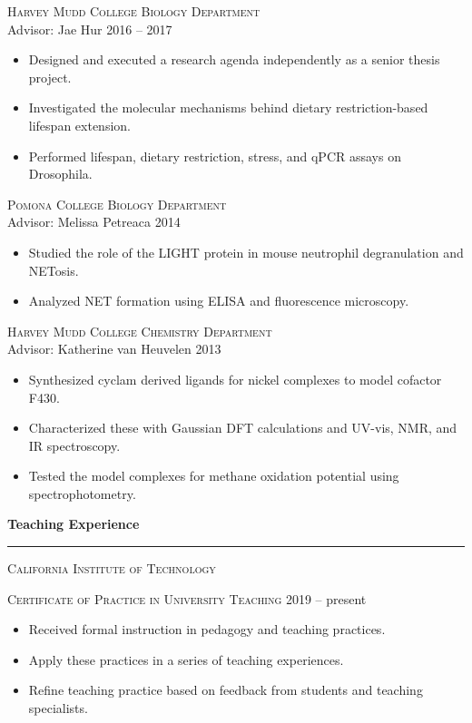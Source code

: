 \documentclass{article}
\newcommand{\cvsection}[1]{%
	{\large \textbf{#1\phantom{,}}}
	\hrule
}
\begin{document}
\medskip

\textsc{Harvey Mudd College Biology Department}\\
Advisor: Jae Hur	\hfill	2016 -- 2017
\begin{itemize}[leftmargin=1.5em, nosep, label=$\vcenter{\hbox{\tiny\textbullet}}$]
\item
Designed and executed a research agenda independently as a senior thesis project.
\item
Investigated the molecular mechanisms behind dietary restriction-based lifespan extension.
\item
Performed lifespan, dietary restriction, stress, and qPCR assays on Drosophila.
\end{itemize}

\medskip

\textsc{Pomona College Biology Department}\\
Advisor: Melissa Petreaca	\hfill	2014
\begin{itemize}[leftmargin=1.5em, nosep, label=$\vcenter{\hbox{\tiny\textbullet}}$]
\item
Studied the role of the LIGHT protein in mouse neutrophil degranulation and NETosis.
\item
Analyzed NET formation using ELISA and fluorescence microscopy.
\end{itemize}

\pagebreak

\textsc{Harvey Mudd College Chemistry Department}\\
Advisor: Katherine	van Heuvelen		\hfill	2013
\begin{itemize}[leftmargin=1.5em, nosep, label=$\vcenter{\hbox{\tiny\textbullet}}$]
\item
Synthesized cyclam derived ligands for nickel complexes to model cofactor F430.
\item
Characterized these with Gaussian DFT calculations and UV-vis, NMR, and IR spectroscopy.
\item
Tested the model complexes for methane oxidation potential using spectrophotometry.
\end{itemize}

\bigskip

\cvsection{Teaching Experience}
\bigskip

{\large \textsc{California Institute of Technology}}
\medskip

\textsc{Certificate of Practice in University Teaching} \hfill 2019 -- present
\begin{itemize}[leftmargin=1.5em, nosep, label=$\vcenter{\hbox{\tiny\textbullet}}$]
\item
Received formal instruction in pedagogy and teaching practices.
\item
Apply these practices in a series of teaching experiences.
\item
Refine teaching practice based on feedback from students and teaching specialists.
\end{itemize}
\end{document}

